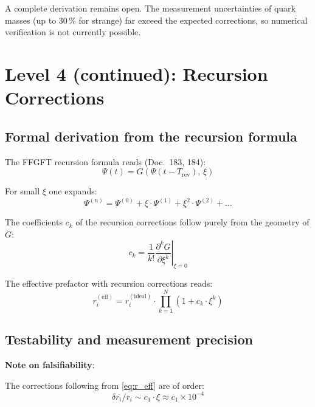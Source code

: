 A complete derivation remains open. The measurement uncertainties
of quark masses (up to 30\,\% for strange) far exceed the expected
corrections, so numerical verification is not currently possible.

\section{Level 4 (continued): Recursion Corrections}

\subsection{Formal derivation from the recursion formula}

The FFGFT recursion formula reads (Doc.~183, 184):
\begin{equation}
    \Psi(t) = G\!\left(\Psi(t - T_{\mathrm{rev}}),\, \xi\right)
    \label{eq:recursion}
\end{equation}

For small $\xi$ one expands:
\begin{equation}
    \Psi^{(n)} = \Psi^{(0)}
    + \xi \cdot \Psi^{(1)}
    + \xi^2 \cdot \Psi^{(2)}
    + \ldots
\end{equation}

The coefficients $c_k$ of the recursion corrections follow purely
from the geometry of $G$:
\begin{equation}
    c_k = \frac{1}{k!}
    \left.\frac{\partial^k G}{\partial \xi^k}\right|_{\xi=0}
    \label{eq:ck}
\end{equation}

The effective prefactor with recursion corrections reads:
\begin{equation}
    r_i^{(\mathrm{eff})} = r_i^{(\mathrm{ideal})}
    \cdot \prod_{k=1}^{N} \left(1 + c_k \cdot \xi^k\right)
    \label{eq:r_eff}
\end{equation}

\subsection{Testability and measurement precision}

\textbf{Note on falsifiability}:

The corrections following from \eqref{eq:r_eff} are of order:
\begin{equation}
    \delta r_i / r_i \sim c_1 \cdot \xi \approx c_1 \times 10^{-4}
\end{equation}

